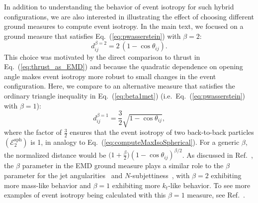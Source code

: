 \documentclass[letterpaper,11pt]{article}
\DeclareRobustCommand{\Eq}[1]{Eq.~(\ref{#1})}
\DeclareRobustCommand{\Ref}[1]{Ref.~\cite{#1}}
\begin{document}
In addition to understanding the behavior of event isotropy for such hybrid configurations, we are also interested in illustrating the effect of choosing different ground measures to compute event isotropy.
%
In the main text, we focused on a ground measure that satisfies \Eq{eq:pwasserstein} with $\beta = 2$:
%
\begin{equation}
d_{ij}^{\beta=2} = 2 \, (1 - \cos \theta_{ij} ).
\label{eq:2was}
\end{equation} 
%
This choice was motivated by the direct comparison to thrust in \Eq{eq:thrust_as_EMD} and because the quadratic dependence on opening angle makes event isotropy more robust to small changes in the event configuration.
%
Here, we compare to an alternative measure that satisfies the ordinary triangle inequality in \Eq{eq:beta1met} (i.e.\ \Eq{eq:pwasserstein} with $\beta = 1$):
%
\begin{equation}
d_{ij}^{\beta=1} = \frac{3}{2} \sqrt{ 1 - \cos \theta_{ij} },
\label{eq:met}
\end{equation} 
%
where the factor of $\frac{3}{2}$ ensures that the event isotropy of two back-to-back particles $(\mathcal{E}^\text{sph}_2)$ is 1, in analogy to \Eq{eq:computeMaxIsoSpherical}.
%
For a generic $\beta$, the normalized distance would be $\big(1 + \frac{\beta}{2}\big) (1 - \cos \theta_{ij})^{\beta/2}$.
%
As discussed in \Ref{Komiske:2020qhg}, the $\beta$ parameter in the EMD ground measure plays a similar role to the $\beta$ parameter for the jet angularities~\cite{Ellis:2010rwa,Larkoski:2014pca} and $N$-subjettiness~\cite{Thaler:2010tr,Thaler:2011gf}, with $\beta = 2$ exhibiting more mass-like behavior and $\beta = 1$ exhibiting more $k_t$-like behavior.
%
To see more examples of event isotropy being calculated with this $\beta=1$ measure, see \Ref{cesarotti:2020mm}.
\end{document}
